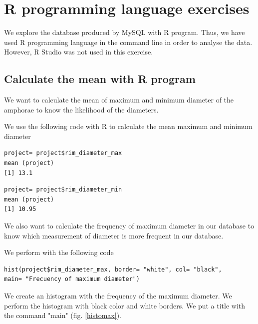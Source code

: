 \documentclass[10pt,a4paper]{article}
\begin{document}
\section{R programming language exercises}

We explore the database produced by MySQL with R program. Thus, we have used R programming language in the command line in order to analyse the data. However, R Studio was not used in this exercise. 

\subsection{Calculate the mean with R program}

We want to calculate the mean of maximum and minimum diameter of the amphorae to know the likelihood of the diameters. 

We use the following code with R to calculate the mean maximum and minimum diameter

\begin{verbatim}
project= project$rim_diameter_max
mean (project)
[1] 13.1
\end{verbatim}

\begin{verbatim}
project= project$rim_diameter_min
mean (project)
[1] 10.95
\end{verbatim}

We also want to calculate the frequency of maximum diameter in our database to know which measurement of diameter is more frequent in our database. 

We perform with the following code

\begin{verbatim}
hist(project$rim_diameter_max, border= "white", col= "black", 
main= "Frecuency of maximum diameter")
\end{verbatim}

We create an histogram with the frequency of the maximum diameter. We perform the histogram with black color and white borders. We put a title with the command "main" (fig. \ref{histomax}).
\end{document}
